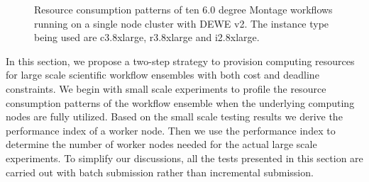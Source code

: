 \begin{figure}[t!]
\centering
\vspace{-10pt}
  \hspace{5pt}
    \hspace{5pt}
  \caption{Resource consumption patterns of ten 6.0 degree Montage workflows running on a single node cluster with DEWE v2. The instance type being used are c3.8xlarge, r3.8xlarge and i2.8xlarge.} 
  \label{fig:10_runs} 
\end{figure}

In this section, we propose a two-step strategy to provision computing resources for large scale scientific workflow ensembles with both cost and deadline constraints. We begin with small scale experiments to profile the resource consumption patterns of the workflow ensemble when the underlying computing nodes are fully utilized. Based on the small scale testing results we derive the performance index of a worker node. Then we use the performance index to determine the number of worker nodes needed for the actual large scale experiments. To simplify our discussions, all the tests presented in this section are carried out with batch submission rather than incremental submission.

